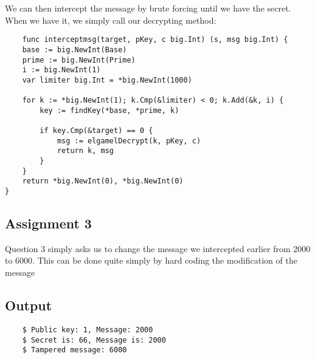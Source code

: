 \documentclass{article}
\begin{document}
We can then intercept the message by brute forcing until we have the secret. When we have it, we simply call our decrypting method:

\begin{lstlisting}
    func interceptmsg(target, pKey, c big.Int) (s, msg big.Int) {
	base := big.NewInt(Base)
	prime := big.NewInt(Prime)
	i := big.NewInt(1)
	var limiter big.Int = *big.NewInt(1000)

	for k := *big.NewInt(1); k.Cmp(&limiter) < 0; k.Add(&k, i) {
		key := findKey(*base, *prime, k)

		if key.Cmp(&target) == 0 {
			msg := elgamelDecrypt(k, pKey, c)
			return k, msg
		}
	}
	return *big.NewInt(0), *big.NewInt(0)
}
\end{lstlisting}

\subsection{Assignment 3}
Question 3 simply asks us to change the message we intercepted earlier from 2000 to 6000. This can be done quite simply by hard coding the modification of the message

\subsection{Output}
\begin{lstlisting}
    $ Public key: 1, Message: 2000
    $ Secret is: 66, Message is: 2000
    $ Tampered message: 6000
\end{lstlisting}


\end{document}

